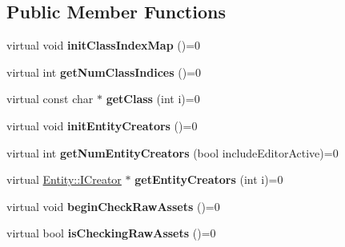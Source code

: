 \subsection*{Public Member Functions}
\begin{DoxyCompactItemize}
\item 
virtual void {\bfseries init\+Class\+Index\+Map} ()=0\hypertarget{class_epic_force_1_1_project_model_base_aa909d56cadfde3a3545a0ff3ea75d86a}{}\label{class_epic_force_1_1_project_model_base_aa909d56cadfde3a3545a0ff3ea75d86a}

\item 
virtual int {\bfseries get\+Num\+Class\+Indices} ()=0\hypertarget{class_epic_force_1_1_project_model_base_af77b938cf78ad435f1e50d12ec2ef304}{}\label{class_epic_force_1_1_project_model_base_af77b938cf78ad435f1e50d12ec2ef304}

\item 
virtual const char $\ast$ {\bfseries get\+Class} (int i)=0\hypertarget{class_epic_force_1_1_project_model_base_ab4a52437096031e35730e689b8113da6}{}\label{class_epic_force_1_1_project_model_base_ab4a52437096031e35730e689b8113da6}

\item 
virtual void {\bfseries init\+Entity\+Creators} ()=0\hypertarget{class_epic_force_1_1_project_model_base_a5daf7471fff79c58d43d67b4c3da470d}{}\label{class_epic_force_1_1_project_model_base_a5daf7471fff79c58d43d67b4c3da470d}

\item 
virtual int {\bfseries get\+Num\+Entity\+Creators} (bool include\+Editor\+Active)=0\hypertarget{class_epic_force_1_1_project_model_base_a74ec3e9c01d673fd9944a28825260e80}{}\label{class_epic_force_1_1_project_model_base_a74ec3e9c01d673fd9944a28825260e80}

\item 
virtual \hyperlink{class_magnum_1_1_entity_1_1_i_creator}{Entity\+::\+I\+Creator} $\ast$ {\bfseries get\+Entity\+Creators} (int i)=0\hypertarget{class_epic_force_1_1_project_model_base_adebcaeca5c93ee7098b3bbcd540947a4}{}\label{class_epic_force_1_1_project_model_base_adebcaeca5c93ee7098b3bbcd540947a4}

\item 
virtual void {\bfseries begin\+Check\+Raw\+Assets} ()=0\hypertarget{class_epic_force_1_1_project_model_base_abdc30d391d369c6f8a61e979ce6b9180}{}\label{class_epic_force_1_1_project_model_base_abdc30d391d369c6f8a61e979ce6b9180}

\item 
virtual bool {\bfseries is\+Checking\+Raw\+Assets} ()=0\hypertarget{class_epic_force_1_1_project_model_base_a9f6de468736bf1bc79cf9aa2bddb25dd}{}\label{class_epic_force_1_1_project_model_base_a9f6de468736bf1bc79cf9aa2bddb25dd}


\end{DoxyCompactItemize}
